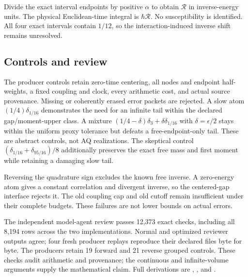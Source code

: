 Divide the exact interval endpoints by positive $\alpha$ to obtain
$\mathcal R$ in inverse-energy units. The physical Euclidean-time integral is
$\hbar\mathcal R$. No susceptibility is identified. All four exact intervals
contain $1/12$, so the interaction-induced inverse shift remains unresolved.

\subsection{Controls and review}
The producer controls retain zero-time centering, all nodes and endpoint
half-weights, a fixed coupling and clock, every arithmetic cost, and actual
source provenance. Missing or coherently erased error packets are rejected.
A slow atom $(1/4)\delta_{1/16}$ demonstrates the need for an infinite tail
within the declared gap/moment-upper class. A mixture
$(1/4-\delta)\delta_3+\delta\delta_{1/16}$ with $\delta=\epsilon/2$ stays
within the uniform proxy tolerance but defeats a free-endpoint-only tail.
These are abstract controls, not AQ realizations. The skeptical control
$(\delta_{1/16}+\delta_{95/16})/8$ additionally preserves the exact free mass
and first moment while retaining a damaging slow tail.

Reversing the quadrature sign excludes the known free inverse. A zero-energy
atom gives a constant correlation and divergent inverse, so the centered-gap
interface rejects it. The old coupling cap and old cutoff remain insufficient
under their complete budgets. These failures are not lower bounds on actual
errors.

The independent model-agent review passes 12,373 exact checks, including all
8,194 rows across the two implementations. Normal and optimized reviewer
outputs agree; four fresh producer replays reproduce their declared files
byte for byte. The producers retain 19 forward and 21 reverse grouped
controls. These checks audit arithmetic and provenance; the continuous and
infinite-volume arguments supply the mathematical claim. Full derivations are
,
, and
.
